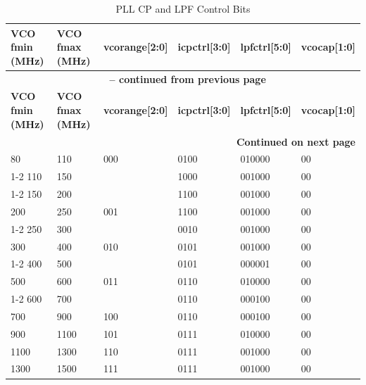 \documentclass[main\_\_EN.tex]{subfiles}
\begin{document}
\begin{longtable}{|p{3cm}|p{3cm}|p{3cm}|p{2cm}|p{2cm}|p{2cm}|}
    \caption{PLL CP and LPF Control Bits} \label{tab:pll-cp-and-lpf-control-bits} \\
    \hline
    \rowcolor{lightgray}
    \textbf{VCO fmin (MHz)} & \textbf{VCO fmax (MHz)} & \textbf{vcorange[2:0]} & \textbf{icpctrl[3:0]} & \textbf{lpfctrl[5:0]} & \textbf{vcocap[1:0]} \\ \hline
    \endfirsthead

    \multicolumn{6}{c}{\bfseries \tablename\ \thetable{} -- continued from previous page}\\\hline
    \rowcolor{lightgray}
    \textbf{VCO fmin (MHz)} & \textbf{VCO fmax (MHz)} & \textbf{vcorange[2:0]} & \textbf{icpctrl[3:0]} & \textbf{lpfctrl[5:0]} & \textbf{vcocap[1:0]} \\ \hline
    \endhead

    \multicolumn{6}{r}{\textbf{Continued on next page}} \\
    \endfoot

    \endlastfoot
    
    80   & 110  & 000 & 0100 & 010000 & 00 \\ \cline{1-2} \cline{4-6}
    110  & 150  &     & 1000 & 001000 & 00 \\ \cline{1-2} \cline{4-6}
    150  & 200  &     & 1100 & 001000 & 00 \\ \hline
    200  & 250  & 001 & 1100 & 001000 & 00 \\ \cline{1-2} \cline{4-6}
    250  & 300  &     & 0010 & 001000 & 00 \\ \hline
    300  & 400  & 010 & 0101 & 001000 & 00 \\ \cline{1-2} \cline{4-6}
    400  & 500  &     & 0101 & 000001 & 00 \\ \hline
    500  & 600  & 011 & 0110 & 010000 & 00 \\ \cline{1-2} \cline{4-6}
    600  & 700  &     & 0110 & 000100 & 00 \\ \hline
    700  & 900  & 100 & 0110 & 000100 & 00 \\ \hline
    900  & 1100 & 101 & 0111 & 010000 & 00 \\ \hline
    1100 & 1300 & 110 & 0111 & 001000 & 00 \\ \hline
    1300 & 1500 & 111 & 0111 & 001000 & 00 \\ \hline
\end{longtable}
\end{document}
